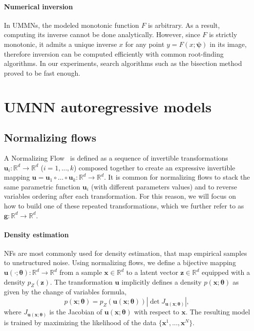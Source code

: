 \documentclass{article}
\newcommand{\mb}{\boldsymbol}
\newcommand{\mbb}{\mathbb}
\begin{document}
\paragraph{Numerical inversion}
In UMMNs, the modeled monotonic function $F$ is arbitrary.
As a result, computing its inverse cannot be done analytically.
However, since $F$ is strictly monotonic, it admits a unique inverse $x$ for any point $y=F(x;\mb{\psi})$ in its image, therefore inversion can be computed efficiently with common root-finding algorithms.
In our experiments, search algorithms such as the bisection method proved to be fast enough.



\section{UMNN autoregressive models}

\subsection{Normalizing flows}

A Normalizing Flow~\citep[NF, ][]{NF} is defined as a sequence of invertible transformations $\mb{u}_i : \mathbb{R}^d \to \mathbb{R}^d$  ($i=1, ..., k$) composed together to create an expressive invertible mapping $\mb{u} = \mb{u}_1 \circ \dots \circ \mb{u}_k : \mathbb{R}^d \to \mathbb{R}^d$.
It is common for normalizing flows to stack the same parametric function $\mb{u}_i$ (with different parameters values) and to reverse variables ordering after each transformation. For this reason, we will focus on how to build one of these repeated transformations, which we further refer to as $\mb{g}: \mathbb{R}^d\rightarrow \mathbb{R}^d$.

\paragraph{Density estimation}
NFs are most commonly used for density estimation, that map empirical samples to unstructured noise.
Using normalizing flows, we define  a bijective mapping $\mb{u}(\cdot ;\mb{\theta}): \mbb{R}^d \rightarrow \mbb{R}^d$ from a sample $\mb{x} \in \mathbb{R}^d$ to a latent vector $\mb{z} \in \mbb{R}^d$ equipped with a density $p_Z(\mb{z})$.
The transformation $\mb{u}$ implicitly defines a density $p(\mb{x}; \mb{\theta})$ as given by the change of variables formula,
\begin{equation}
    p(\mb{x}; \mb{\theta}) = p_Z(\mb{u}(\mb{x};\mb{\theta})) \left| \det  J_{\mb{u}(\mb{x};\mb{\theta})} \right|, \label{eq:NF_DE}
\end{equation}
where $J_{\mb{u}(\mb{x};\mb{\theta})}$ is the Jacobian of $\mb{u}(\mb{x};\mb{\theta})$ with respect to $\mb x$.
The resulting model is trained by maximizing the likelihood of the data $\{\mb{x}^1, ..., \mb{x}^N\}$.
\end{document}

